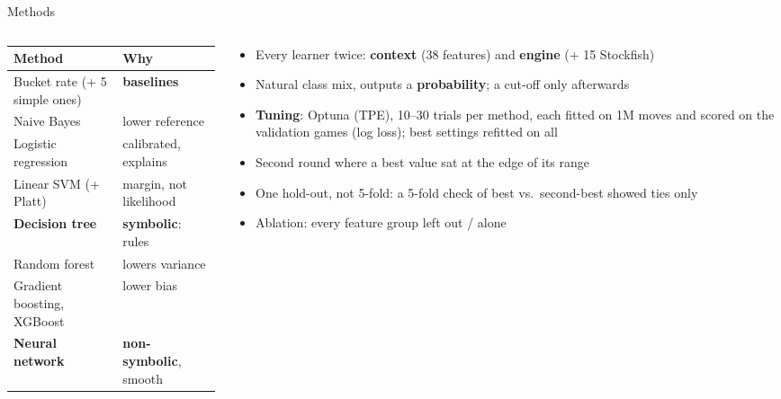 \documentclass[aspectratio=169,11pt]{beamer}
\newcommand{\hl}[1]{\textcolor{accent}{\textbf{#1}}}
\begin{document}
\begin{frame}{Methods}
  \small
  \begin{columns}[T]
    \begin{column}{.5\textwidth}
      \footnotesize
      \begin{tabular}{@{}ll@{}}
        \toprule
        Method & Why \\
        \midrule
        Bucket rate (+ 5 simple ones) & \textbf{baselines} \\
        Naive Bayes & lower reference \\
        Logistic regression & calibrated, explains \\
        Linear SVM (+ Platt) & margin, not likelihood \\
        \textbf{Decision tree} & \textbf{symbolic}: rules \\
        Random forest & lowers variance \\
        Gradient boosting, XGBoost & lower bias \\
        \textbf{Neural network} & \textbf{non-symbolic}, smooth \\
        \bottomrule
      \end{tabular}
    \end{column}
    \begin{column}{.46\textwidth}
      \footnotesize
      \begin{itemize}
        \item Every learner twice: \hl{context} (38 features) and \hl{engine} (+ 15 Stockfish)
        \item Natural class mix, outputs a \textbf{probability}; a cut-off only afterwards
        \item \hl{Tuning}: Optuna (TPE), 10--30 trials per method, each fitted on 1M moves and scored on the
          validation games (log loss); best settings refitted on all
        \item Second round where a best value sat at the edge of its range
        \item One hold-out, not 5-fold: a 5-fold check of best vs.\ second-best showed ties only
        \item Ablation: every feature group left out / alone
      \end{itemize}
    \end{column}
  \end{columns}
\end{frame}
\end{document}

